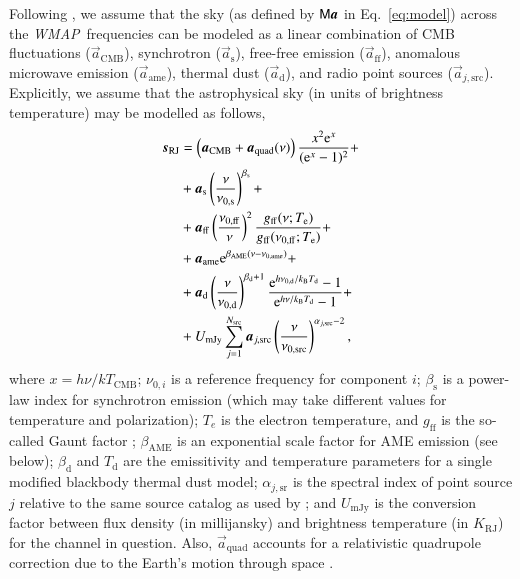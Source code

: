 \documentclass[twocolumn]{../../common/aa}
\def\WMAP{\emph{WMAP}}
\renewcommand{\a}[0]{\vec{a}}
\newcommand{\M}[0]{\tens{M}}
\newcommand{\Te}[0]{T_{\rm e}}
\newcommand{\e}{\mathrm e}
\def\Tdust{\ifmmode T_\mathrm{d}\else $T_{\mathrm{d}}$\fi}
\def\bdust{\ifmmode \beta_\mathrm{d}\else $\beta_{\mathrm{d}}$\fi}
\def\bsynch{\ifmmode \beta_\mathrm{s}\else $\beta_{\mathrm{s}}$\fi}
\def\nuzeros{\ifmmode \nu_{0,\mathrm{s}}\else $\nu_{0,\mathrm{s}}$\fi}
\def\nuzeroff{\ifmmode \nu_{0,\mathrm{ff}}\else $\nu_{0,\mathrm{ff}}$\fi}
\def\nuzerod{\ifmmode \nu_{0,\mathrm{d}}\else $\nu_{0,\mathrm{d}}$\fi}
\def\nuzeroame{\ifmmode \nu_{0,\mathrm{ame}}\else $\nu_{0,\mathrm{ame}}$\fi}
\def\nuzerosrc{\ifmmode \nu_{0,\mathrm{src}}\else $\nu_{0,\mathrm{src}}$\fi}
\def\nup{\ifmmode \nu_{\mathrm{p}}\else $\nu_{\mathrm{p}}$\fi}
\def\Te{\ifmmode T_{\mathrm{e}}\else $T_{\mathrm{e}}$\fi}
\def\kB{\ifmmode k_\mathrm{B}\else $k_{\mathrm{B}}$\fi}
\begin{document}
Following \citet{bp01}, we assume that the sky (as defined by $\M\boldsymbol a$ in Eq.~\ref{eq:model}) across the \WMAP\ frequencies can be modeled as a linear combination of CMB fluctuations ($\vec{a}_{\mathrm{CMB}}$), synchrotron ($\vec{a}_{\mathrm{s}}$), free-free emission ($\vec{a}_{\mathrm{ff}}$), anomalous microwave emission ($\vec{a}_{\mathrm{ame}}$), thermal dust ($\vec{a}_{\mathrm{d}}$), and radio point sources ($\vec{a}_{j,\mathrm{src}}$). Explicitly, we assume that the astrophysical sky (in units of brightness temperature) may be modelled as follows,
\begin{align}
  \vec{s}_{\mathrm{RJ}} &= \left(\vec{a}_{\mathrm{CMB}}+\vec{a}_{\mathrm{quad}}(\nu)\right) \frac{x^2 \e^x}{(\e^x -1)^2}+\label{eq:cmb_astsky}\\
  &+ \vec{a}_{\mathrm{s}} \left(\frac{\nu}{\nuzeros}\right)^{\bsynch} + \label{eq:synch_astsky}\\
  &+ \vec{a}_{\mathrm{ff}} \left(\frac{\nuzeroff}{\nu}\right)^2 \frac{g_{\mathrm{ff}}(\nu;\Te) }{g_{\mathrm{ff}}(\nuzeroff;\Te)} +\label{eq:ff_astsky}\\
  &+ \vec{a}_{\mathrm{ame}} \e^{\beta_{\mathrm{AME}}(\nu-\nu_{0,\mathrm{ame}})}+\label{eq:ame_astsky}  \\
  &+ \vec{a}_{\mathrm{d}} \left(\frac{\nu}{\nuzerod}\right)^{\bdust+1} \frac{\e^{h\nuzerod/\kB\Tdust}-1}{\e^{h\nu/\kB\Tdust}-1}+ \label{eq:dust_astsky}\\
  &+ U_{\mathrm{mJy}} \sum_{j=1}^{N_{\mathrm{src}}} \vec{a}_{j,\mathrm{src}} \left(\frac{\nu}{\nuzerosrc}\right)^{\alpha_{j,\mathrm{src}}-2}, \label{eq:sum_ptsrc}
\end{align}
where $x=h\nu/kT_{\mathrm{CMB}}$; $\nu_{0,i}$ is a reference frequency for component $i$; $\beta_{\mathrm{s}}$ is a power-law index for synchrotron emission (which may take different values for temperature and polarization); $T_e$ is the electron temperature, and $g_{\mathrm{ff}}$ is the so-called Gaunt factor \citep{dickinson2003}; $\beta_{\mathrm{AME}}$ is an exponential scale factor for AME emission (see below); $\beta_{\mathrm{d}}$ and $T_{\mathrm{d}}$ are the emissitivity and temperature parameters for a single modified blackbody thermal dust model; $\alpha_{j,\mathrm{sr}}$ is the spectral index of point source $j$ relative to the same source catalog as used by \citet{planck2016-l04}; and $U_{\mathrm{mJy}}$ is the conversion factor between flux density (in millijansky) and brightness temperature (in $K_{\mathrm{RJ}}$) for the channel in question. Also, $\a_{\mathrm{quad}}$ accounts for a relativistic quadrupole correction due to the Earth's motion through space \citep{Notari:2015}.
\end{document}
